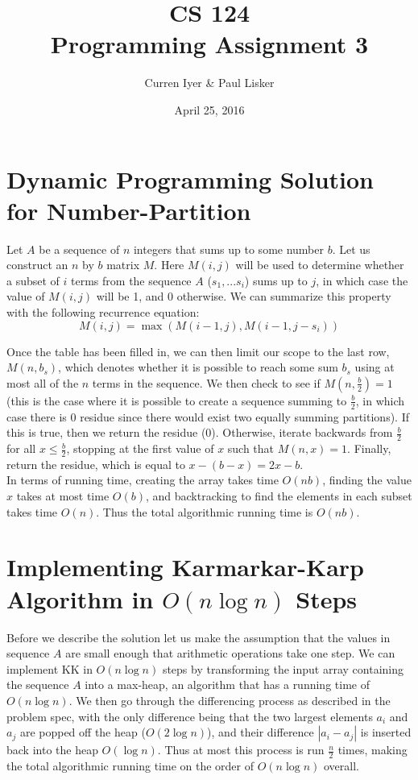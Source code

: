 \documentclass[12pt]{article}
\title{CS 124\\Programming Assignment 3}
\author{Curren Iyer \& Paul Lisker}
\date{April 25, 2016}
\begin{document}
\maketitle

\section{Dynamic Programming Solution for Number-Partition}

Let $A$ be a sequence of $n$ integers that sums up to some number $b$.  Let us construct an $n$ by $b$ matrix $M$.  Here $M(i,j)$ will be used to determine whether a subset of $i$ terms from the sequence $A$ ($s_1,...s_i$) sums up to $j$, in which case the value of $M(i,j)$ will be 1, and 0 otherwise.  We can summarize this property with the following recurrence equation: $$M(i,j) = \max(M(i-1,j),M(i-1,j-s_i))$$

Once the table has been filled in, we can then limit our scope to the last row, $M(n,b_s)$, which denotes whether it is possible to reach some sum $b_s$ using at most all of the $n$ terms in the sequence. We then check to see if $M(n,\frac{b}{2})=1$ (this is the case where it is possible to create a sequence summing to $\frac{b}{2}$, in which case there is 0 residue since there would exist two equally summing partitions).  If this is true, then we return the residue (0).  Otherwise, iterate backwards from $\frac{b}{2}$ for all $x \leq \frac{b}{2}$, stopping at the first value of $x$ such that $M(n,x)=1$.  Finally, return the residue, which is equal to $x-(b-x) = 2x-b$.\\

In terms of running time, creating the array takes time $O(nb)$, finding the value $x$ takes at most time $O(b)$, and backtracking to find the elements in each subset takes time $O(n)$.  Thus the total algorithmic running time is $O(nb)$.

\section{Implementing Karmarkar-Karp Algorithm in $O(n \log{n})$ Steps}

Before we describe the solution let us make the assumption that the values in sequence $A$ are small enough that arithmetic operations take one step.  We can implement KK in $O(n \log{n})$ steps by transforming the input array containing the sequence $A$ into a max-heap, an algorithm that has a running time of $O(n \log{n})$.  We then go through the differencing process as described in the problem spec, with the only difference being that the two largest elements $a_i$ and $a_j$ are popped off the heap ($O(2 \log{n})$), and their difference $|a_i-a_j|$ is inserted back into the heap $O(\log{n})$.  Thus at most this process is run $\frac{n}{2}$ times, making the total algorithmic running time on the order of $O(n \log{n})$ overall.
\end{document}
